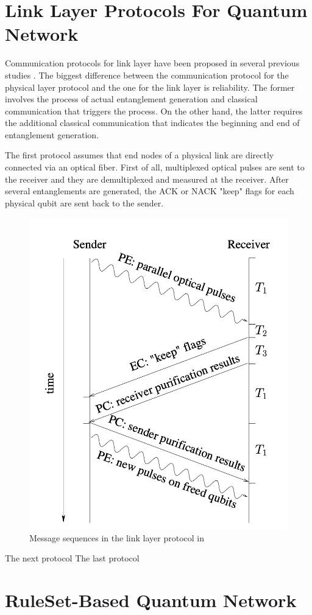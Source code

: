 \section{Link Layer Protocols For Quantum Network}

Communication protocols for link layer have been proposed in several previous studies \cite{Van_Meter_2009,Dahlberg_2019,matsuo2019simulation}.
The biggest difference between the communication protocol for the physical layer protocol and the one for the link layer is reliability.
The former involves the process of actual entanglement generation and classical communication that triggers the process. On the other hand, the latter requires the additional classical communication that indicates the beginning and end of entanglement generation.

The first protocol \cite{Van_Meter_2009} assumes that end nodes of a physical link are directly connected via an optical fiber. First of all, multiplexed optical pulses are sent to the receiver and they are demultiplexed and measured at the receiver.
After several entanglements are generated, the ACK or NACK "keep" flags for each physical qubit are sent back to the sender.
\begin{figure}[H]
  \centerline{\includegraphics{images/link_protocol_rdv.jpg}}
  \caption{Message sequences in the link layer protocol in  \cite{Van_Meter_2009}}
\end{figure}

The next protocol \cite{Dahlberg_2019}
The last protocol \cite{matsuo2019simulation}
\section{RuleSet-Based Quantum Network}
